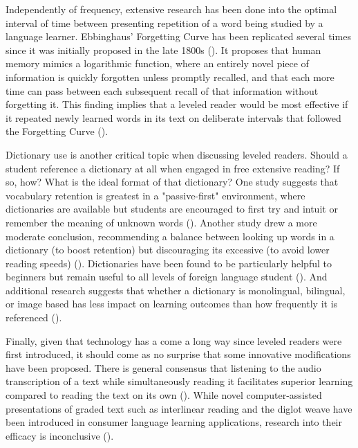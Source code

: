 \documentclass[
	letterpaper, %
]{jdf}
\newcommand{\pcite}[1]{(\cite{#1})}
\begin{document}
Independently of frequency, extensive research has been done into the optimal interval of time between presenting repetition of a word being studied by a language learner. Ebbinghaus' Forgetting Curve has been replicated several times since it was initially proposed in the late 1800s \pcite{Murre2015ReplicationAA}. It proposes that human memory mimics a logarithmic function, where an entirely novel piece of information is quickly forgotten unless promptly recalled, and that each more time can pass between each subsequent recall of that information without forgetting it. This finding implies that a leveled reader would be most effective if it repeated newly learned words in its text on deliberate intervals that followed the Forgetting Curve \pcite{shortestpathrepetitionscheduling}.

Dictionary use is another critical topic when discussing leveled readers. Should a student reference a dictionary at all when engaged in free extensive reading? If so, how? What is the ideal format of that dictionary? One study suggests that vocabulary retention is greatest in a "passive-first" environment, where dictionaries are available but students are encouraged to first try and intuit or remember the meaning of unknown words \pcite{mcdonald2016}. Another study drew a more moderate conclusion, recommending a balance between looking up words in a dictionary (to boost retention) but discouraging its excessive (to avoid lower reading speeds) \pcite{dictionaryimportance}. Dictionaries have been found to be particularly helpful to beginners but remain useful to all levels of foreign language student \pcite{dictionaryvalue}. And additional research suggests that whether a dictionary is monolingual, bilingual, or image based has less impact on learning outcomes than how frequently it is referenced \pcite{dictionarypitfalls, imagesdictionary, bilingual_dictionary}.

Finally, given that technology has a come a long way since leveled readers were first introduced, it should come as no surprise that some innovative modifications have been proposed. There is general consensus that listening to the audio transcription of a text while simultaneously reading it facilitates superior learning compared to reading the text on its own \pcite{Chang2015ImprovingRR}. While novel computer-assisted presentations of graded text such as interlinear reading and the diglot weave have been introduced in consumer language learning applications, research into their efficacy is inconclusive \pcite{hyplern_interlinear_reading, diglot_weave}.
\end{document}
